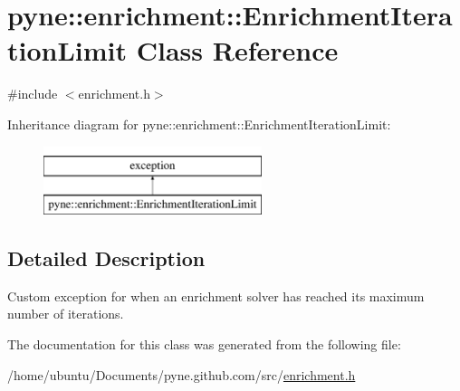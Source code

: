 \hypertarget{classpyne_1_1enrichment_1_1_enrichment_iteration_limit}{}\section{pyne\+:\+:enrichment\+:\+:Enrichment\+Iteration\+Limit Class Reference}
\label{classpyne_1_1enrichment_1_1_enrichment_iteration_limit}


{\ttfamily \#include $<$enrichment.\+h$>$}

Inheritance diagram for pyne\+:\+:enrichment\+:\+:Enrichment\+Iteration\+Limit\+:\begin{figure}[H]
\begin{center}
\leavevmode
\includegraphics[height=2.000000cm]{classpyne_1_1enrichment_1_1_enrichment_iteration_limit}
\end{center}
\end{figure}


\subsection{Detailed Description}
Custom exception for when an enrichment solver has reached its maximum number of iterations. 

The documentation for this class was generated from the following file\+:\begin{DoxyCompactItemize}
\item 
/home/ubuntu/\+Documents/pyne.\+github.\+com/src/\hyperlink{enrichment_8h}{enrichment.\+h}\end{DoxyCompactItemize}
